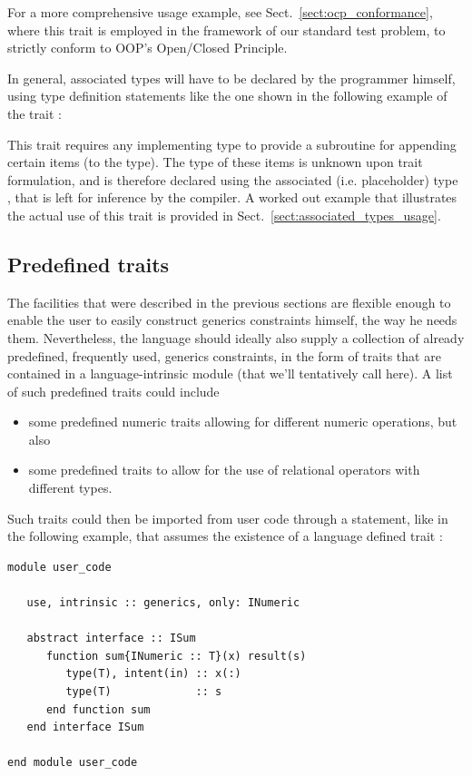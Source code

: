 \documentclass[11pt,oneside]{report}
\newcommand{\code}[1]{{\selectfont\ttfamily{#1}}}
\begin{document}

For a more comprehensive usage example, see
Sect.~\ref{sect:ocp_conformance}, where this trait is employed in the
framework of our standard test problem, to strictly conform to OOP's
Open/Closed Principle.

In general, associated types will have to be declared by the
programmer himself, using type definition statements like the one
shown in the following example of the trait \code{IAppendable}:

This trait requires any implementing type to provide a subroutine for
appending certain items (to the type). The type of these items is
unknown upon trait formulation, and is therefore declared using the
associated (i.e. placeholder) type \code{Element}, that is left for
inference by the compiler. A worked out example that illustrates the
actual use of this trait is provided in
Sect.~\ref{sect:associated_types_usage}.

\subsection{Predefined traits}
\label{sect:predefined_traits}

The facilities that were described in the previous sections are
flexible enough to enable the user to easily construct generics
constraints himself, the way he needs them. Nevertheless, the language
should ideally also supply a collection of already predefined,
frequently used, generics constraints, in the form of traits that are
contained in a language-intrinsic module (that we'll tentatively call
\code{generics} here). A list of such predefined traits could include
\begin{itemize}
\item
  some predefined numeric traits allowing for different numeric
  operations, but also
\item
  some predefined traits to allow for the use of relational operators
  with different types.
\end{itemize}

Such traits could then be imported from user code through a \code{use}
statement, like in the following example, that assumes the existence of
a language defined trait \code{INumeric}:
\begin{lstlisting}[language=LFortran,style=boxed]
module user_code

   use, intrinsic :: generics, only: INumeric

   abstract interface :: ISum
      function sum{INumeric :: T}(x) result(s)
         type(T), intent(in) :: x(:)
         type(T)             :: s
      end function sum
   end interface ISum

end module user_code
\end{lstlisting}
\end{document}
